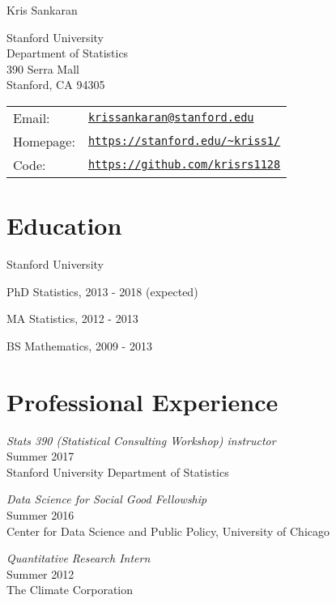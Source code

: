 \documentclass[letterpaper]{article}
\def\name{Kris Sankaran}
\renewenvironment{itemize}{
  \begin{list}{}{
    \setlength{\leftmargin}{1.5em}
  }
}{
  \end{list}
}
\begin{document}
{\huge \name}


\vspace{0.25in}

\begin{minipage}{0.45\linewidth}
  Stanford University \\
  Department of Statistics \\
  390 Serra Mall \\
  Stanford, CA 94305
\end{minipage}
\begin{minipage}{0.45\linewidth}
  \begin{tabular}{ll}
    Email: & \href{mailto:krissankaran@stanford.edu}{\tt krissankaran@stanford.edu} \\
    Homepage: & \href{http://stanford.edu/\textasciitilde kriss1}{\tt https://stanford.edu/\textasciitilde kriss1/} \\
    Code: & \href{https://github.com/krisrs1128}{\tt https://github.com/krisrs1128}
  \end{tabular}
\end{minipage}

\section*{Education}
Stanford University
\begin{itemize}
  \item PhD Statistics, 2013 - 2018 (expected)
  \item MA Statistics, 2012 - 2013
  \item BS Mathematics, 2009 - 2013
\end{itemize}

\section*{Professional Experience}
\begin{itemize}
\item \textit{Stats 390 (Statistical Consulting Workshop) instructor} \\
  Summer 2017 \\
  Stanford University Department of Statistics
\item \textit{Data Science for Social Good Fellowship} \\
  Summer 2016 \\
  Center for Data Science and Public Policy, University of Chicago
\item \textit{Quantitative Research Intern} \\
  Summer 2012 \\
  The Climate Corporation
\end{itemize}
\end{document}
